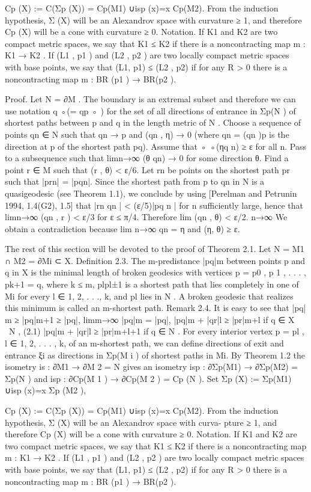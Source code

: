 Cp (X) := C(Σp (X)) = Cp(M1) ∪isp (x)=x Cp(M2).
From the induction hypothesis, Σ
(X) will be an Alexandrov space with curvature ≥ 1, and therefore Cp (X) will be a cone with curvature ≥ 0.
Notation. 
If K1 and K2 are two compact metric spaces, we say that K1 ≤ K2
if there is a noncontracting map m : K1 → K2 . If (L1 , p1 ) and (L2 , p2 ) are two
locally compact metric spaces with base points, we say that (L1, p1) ≤ (L2 , p2)
if for any R > 0 there is a noncontracting map m : BR (p1 ) → BR(p2 ).

Proof. Let N = ∂M . The boundary is an extremal subset and therefore we
can use notation q ◦(= qp ◦ ) for the set of all directions of entrance in Σp(N ) of
shortest paths between p and q in the length metric of N .
Choose a sequence of points qn ∈ N such that qn → p and (qn , η) → 0
(where qn = (qn )p is the direction at p of the shortest path pq). Assume that
◦ ◦(ηq n) ≥ ε for all n. Pass to a subsequence such that limn→∞ (θ qn) → 0 for
some direction θ.
Find a point r ∈ M such that (r , θ) < ε/6. Let {rn } be points on the
shortest path pr such that |prn| = |pqn|. Since the shortest path from p to qn
in N is a quasigeodesic (see Theorem 1.1), we conclude by using [Perelman and
Petrunin 1994, 1.4(G2), 1.5] that |rn qn | < (ε/5)|pq n | for n sufficiently large,
hence that limn→∞ (qn , r ) < ε/3 for ε ≤ π/4. Therefore
lim
 (qn , θ) < ε/2.
n→∞
We obtain a contradiction because lim n→∞ qn = η and
 (η, θ) ≥ ε.

The rest of this section will be devoted to the proof of Theorem 2.1. Let N =
M1 ∩ M2 = ∂Mi ⊂ X.
Definition 2.3. The m-predistance |pq|m between points p and q in X is the
minimal length of broken geodesics with vertices p = p0 , p 1 , . . . , pk+1 = q, where
k ≤ m, plpl±1 is a shortest path that lies completely in one of Mi for every
l ∈ {1, 2, . . ., k}, and pl lies in N . A broken geodesic that realizes this minimum
is called an m-shortest path.
Remark 2.4. It is easy to see that |pq| m ≥ |pq|m+1 ≥ |pq|, limm→∞ |pq|m = |pq|,
|pq|m + |qr|l ≥ |pr|m+l
 if q ∈ X \ N ,
(2.1)
|pq|m + |qr|l ≥ |pr|m+l+1
 if q ∈ N .
For every interior vertex p = pl , l ∈ {1, 2, . . . , k}, of an m-shortest path, we can
define directions of exit and entrance ξi as directions in Σp(M i ) of shortest paths
in Mi.
By Theorem 1.2 the isometry is : ∂M1 → ∂M 2 = N gives an isometry isp :
∂Σp(M1) → ∂Σp(M2) = Σp(N ) and isp : ∂Cp(M 1 ) → ∂Cp(M 2 ) = Cp (N ). Set
Σp 
 (X) := Σp(M1) ∪isp (x)=x Σp (M2 ),
 
Cp (X) := C(Σp (X)) = Cp(M1) ∪isp (x)=x Cp(M2).
From the induction hypothesis, Σ
(X) will be an Alexandrov space with curva-
pture ≥ 1, and therefore Cp (X) will be a cone with curvature ≥ 0.
Notation. If K1 and K2 are two compact metric spaces, we say that K1 ≤ K2
if there is a noncontracting map m : K1 → K2 . If (L1 , p1 ) and (L2 , p2 ) are two
locally compact metric spaces with base points, we say that (L1, p1) ≤ (L2 , p2)
if for any R > 0 there is a noncontracting map m : BR (p1 ) → BR(p2 ).


